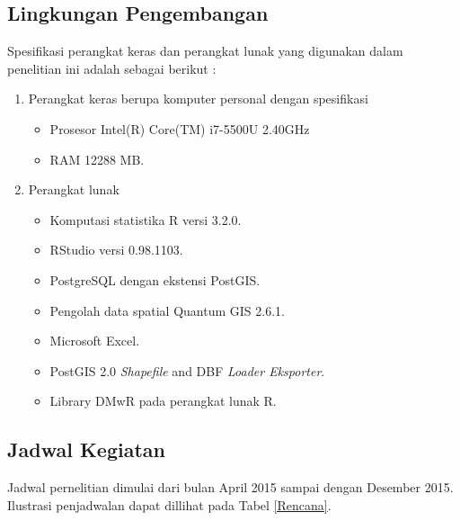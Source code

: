 \subsection*{Lingkungan Pengembangan}
Spesifikasi perangkat keras dan perangkat lunak yang digunakan dalam penelitian ini adalah sebagai berikut :
\begin{enumerate}[noitemsep] 
	\item Perangkat keras berupa komputer personal dengan spesifikasi 
	\begin{itemize}
			\item Prosesor Intel(R) Core(TM) i7-5500U  2.40GHz
			\item RAM 12288 MB.
	\end{itemize}
		\item Perangkat lunak
		\begin{itemize}
			\item Komputasi statistika R versi 3.2.0.
			\item RStudio versi 0.98.1103.
			\item PostgreSQL dengan ekstensi PostGIS.
			\item Pengolah data spatial Quantum GIS 2.6.1.
			\item Microsoft Excel.
			\item PostGIS 2.0 \textit{Shapefile} and DBF \textit{Loader Eksporter}.
			\item Library DMwR pada perangkat lunak R.
		\end{itemize}
\end{enumerate}





\subsection*{Jadwal Kegiatan}
Jadwal pernelitian dimulai dari bulan April 2015 sampai dengan Desember 2015. Ilustrasi penjadwalan dapat dillihat pada Tabel \ref{Rencana}.
% 

